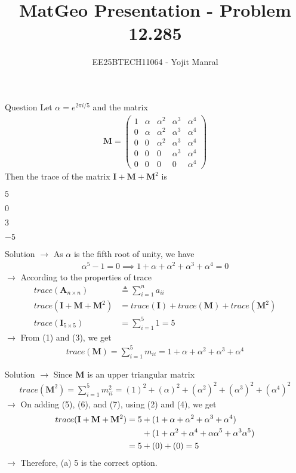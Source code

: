 \documentclass{beamer}
\title{MatGeo Presentation - Problem 12.285}
\author{EE25BTECH11064 - Yojit Manral}
\date{}
\numberwithin{equation}{section}
\theoremstyle{remark}
\newcommand{\myvec}[1]{\ensuremath{\begin{pmatrix}#1\end{pmatrix}}}
\let\vec\mathbf
\begin{document}
\frame{\titlepage}
\begin{frame}{Question}
Let $\alpha = e^{2\pi i/5}$ and the matrix
\begin{align}
    \vec{M} = \myvec{1&\alpha&\alpha^2&\alpha^3&\alpha^4\\0&\alpha&\alpha^2&\alpha^3&\alpha^4\\0&0&\alpha^2&\alpha^3&\alpha^4\\0&0&0&\alpha^3&\alpha^4\\0&0&0&0&\alpha^4}
\end{align}
Then the trace of the matrix $\vec{I} + \vec{M} + \vec{M}^2$ is
\begin{enumerate}[label=(\alph*)]
\begin{multicols}{4}
    \item $5$
    \item $0$
    \item $3$
    \item $-5$
\end{multicols}
\end{enumerate}
\end{frame}

\begin{frame}{Solution}
$\rightarrow$ As $\alpha$ is the fifth root of unity, we have
\begin{align}
    \alpha^5 - 1 = 0 \implies 1 + \alpha + \alpha^2 + \alpha^3 + \alpha^4 = 0
\end{align}
$\rightarrow$ According to the properties of trace
\begin{align}
    trace(\vec{A}_{n\times n}) &\triangleq \sum_{i=1}^{n} a_{ii} \\
    trace(\vec{I}+\vec{M}+\vec{M}^2) &= trace(\vec{I})+trace(\vec{M})+trace(\vec{M}^2) \\
    trace(\vec{I}_{5\times5}) &= \sum_{i=1}^{5} 1 = 5
\end{align}
$\rightarrow$ From (1) and (3), we get
\begin{align}
    trace(\vec{M}) = \sum_{i=1}^{5} m_{ii} = 1 + \alpha + \alpha^2 + \alpha^3 + \alpha^4
\end{align}
\end{frame}

\begin{frame}{Solution}
$\rightarrow$ Since $\vec{M}$ is an upper triangular matrix
\begin{align}
    trace(\vec{M}^2) = \sum_{i=1}^{5} m_{ii}^2 = (1)^2 + (\alpha)^2 + (\alpha^2)^2 + (\alpha^3)^2 + (\alpha^4)^2
\end{align}
$\rightarrow$ On adding (5), (6), and (7), using (2) and (4), we get
\begin{align}
    trace(\vec{I}+\vec{M}+\vec{M}^2) = 5 &+ (1 + \alpha + \alpha^2 + \alpha^3 + \alpha^4) \notag \\ &+ (1 + \alpha^2 + \alpha^4 + \alpha\alpha^5 + \alpha^3\alpha^5) \\
    = 5 &+ (0) + (0) = 5
\end{align}
$\rightarrow$ Therefore, (a) 5 is the correct option.
\end{frame}
\end{document}

